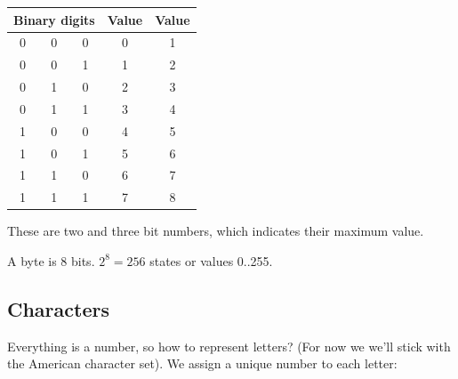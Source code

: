 \begin{fullwidth}
\begin{center}
\begin{tabular}{|ccc|c|c|}
\hline
\multicolumn{3}{|c|}{Binary digits} & Value & Value \\
\hline
0 & 0 & 0 & 0 & 1\\
0 & 0 & 1 & 1 & 2\\
0 & 1 & 0 & 2 & 3\\
0 & 1 & 1 & 3 & 4\\
1 & 0 & 0 & 4 & 5\\
1 & 0 & 1 & 5 & 6\\
1 & 1 & 0 & 6 & 7\\
1 & 1 & 1 & 7 & 8\\
\hline
\end{tabular}
\end{center}

These are two and three bit numbers, which indicates their maximum value.

A byte is 8 bits. $2^8 = 256$ states or values 0..255.

\subsection{Characters}

Everything is a number, so how to represent letters? (For now we we'll stick with the American character set). We assign a unique number to each letter:



\end{fullwidth}
